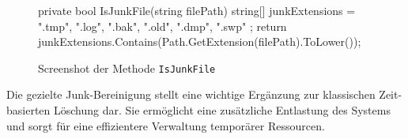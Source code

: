 \begin{figure}[H]
    \centering
    \begin{cs}
private bool IsJunkFile(string filePath)
{
    string[] junkExtensions = { ".tmp", ".log", ".bak", ".old", ".dmp", ".swp" };
    return junkExtensions.Contains(Path.GetExtension(filePath).ToLower());
}
\end{cs}
    \caption{Screenshot der Methode \texttt{IsJunkFile}}
\end{figure}

Die gezielte Junk-Bereinigung stellt eine wichtige Ergänzung zur klassischen Zeit-basierten Löschung dar. Sie ermöglicht eine zusätzliche Entlastung des Systems und sorgt für eine effizientere Verwaltung temporärer Ressourcen.

